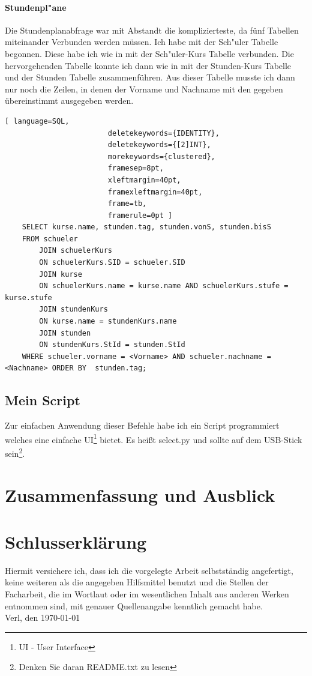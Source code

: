 \documentclass[a4paper, 12pt]{article}
\theoremstyle{plain}
\theoremstyle{definition}
\begin{document}
	\paragraph{Stundenpl"ane} Die Stundenplanabfrage war mit Abstandt die komplizierteste, da fünf Tabellen miteinander Verbunden werden müssen. Ich habe mit der Sch"uler Tabelle begonnen. Diese habe ich wie in  mit der Sch"uler-Kurs Tabelle verbunden. Die hervorgehenden Tabelle konnte ich dann wie in  mit der Stunden-Kurs Tabelle und der Stunden Tabelle zusammenführen. Aus dieser Tabelle musste ich dann nur noch die Zeilen, in denen der Vorname und Nachname mit den gegeben übereinstimmt ausgegeben werden.
	\begin{lstlisting}[ language=SQL,
	                    deletekeywords={IDENTITY},
	                    deletekeywords={[2]INT},
	                    morekeywords={clustered},
	                    framesep=8pt,
	                    xleftmargin=40pt,
	                    framexleftmargin=40pt,
	                    frame=tb,
	                    framerule=0pt ]	
    SELECT kurse.name, stunden.tag, stunden.vonS, stunden.bisS
    FROM schueler 
        JOIN schuelerKurs
        ON schuelerKurs.SID = schueler.SID
        JOIN kurse 
        ON schuelerKurs.name = kurse.name AND schuelerKurs.stufe = kurse.stufe
        JOIN stundenKurs
        ON kurse.name = stundenKurs.name
        JOIN stunden
        ON stundenKurs.StId = stunden.StId
    WHERE schueler.vorname = <Vorname> AND schueler.nachname = <Nachname> ORDER BY  stunden.tag;
	\end{lstlisting}	
	\subsection{Mein Script}
	Zur einfachen Anwendung dieser Befehle habe ich ein Script programmiert welches eine einfache UI\footnote{UI - User Interface} bietet. Es heißt select.py und sollte auf dem USB-Stick sein\footnote{Denken Sie daran README.txt zu lesen}.
	\section{Zusammenfassung und Ausblick}
	\label{sec:end}
	\newpage
	\printbibliography	
	\appendix
	
	\newpage
	\section*{Schlusserklärung}
	Hiermit versichere ich, dass ich die vorgelegte Arbeit selbstständig angefertigt, keine weiteren als die angegeben	 Hilfsmittel benutzt und die Stellen der Facharbeit, die im Wortlaut oder im wesentlichen Inhalt aus anderen Werken entnommen sind, mit genauer Quellenangabe kenntlich gemacht habe.\\
	\vspace{4cm}
	Verl, den \today
\end{document}

